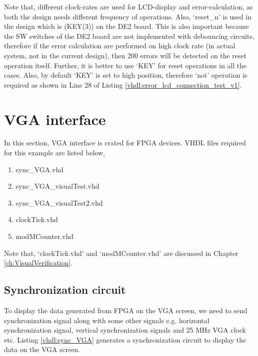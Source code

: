 \begin{noNumBox}
	Note that, different clock-rates are used for LCD-display and error-calculation, as both the design needs different frequency of operations. Also, `reset\_n' is used in the design which is (KEY(3)) on the DE2 board. This is also important because the SW switches of the DE2 board are not implemented with debouncing circuits, therefore if the error calculation are performed on high clock rate (in actual system, not in the current design), then 200 errors will be detected on the reset operation itself. Further, it is better to use `KEY' for reset operations in all the cases. Also, by default `KEY' is set to high position, therefore `not' operation is required as shown in Line 28 of Listing \ref{vhdl:error_lcd_connection_test_v1}. 
\end{noNumBox}









\section{VGA interface}
In this section, VGA interface is crated for FPGA devices. VHDL files required for this example are listed below, 
\begin{enumerate}
	\item sync\_VGA.vhd
	\item sync\_VGA\_visualTest.vhd
	\item sync\_VGA\_visualTest2.vhd
	\item clockTick.vhd
	\item modMCounter.vhd
\end{enumerate}
Note that, `clockTick.vhd' and `modMCounter.vhd' are discussed in Chapter \ref{ch:VisualVerification}.



\subsection{Synchronization circuit}
To display the data generated from FPGA on the VGA screen, we need to send synchronization signal along with some other signals e.g. horizontal synchronization signal, vertical synchronization signals and 25 MHz VGA clock etc. Listing \ref{vhdl:sync_VGA} generates a synchronization circuit to display the data on the VGA screen.   



